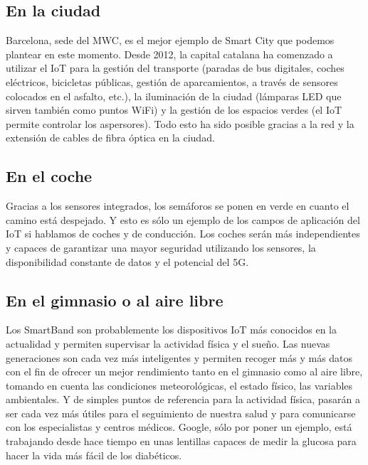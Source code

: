\documentclass[]{article}
\begin{document}
\subsection{En la ciudad}

Barcelona, sede del MWC, es el mejor ejemplo de Smart City que podemos plantear en este momento. Desde 2012, la capital catalana ha comenzado a utilizar el IoT para la gestión del transporte (paradas de bus digitales, coches eléctricos, bicicletas públicas, gestión de aparcamientos, a través de sensores colocados en el asfalto, etc.), la iluminación de la ciudad (lámparas LED que sirven también como puntos WiFi) y la gestión de los espacios verdes (el IoT permite controlar los aspersores). Todo esto ha sido posible gracias a la red y la extensión de cables de fibra óptica en la ciudad.\\

\subsection{En el coche}

Gracias a los sensores integrados, los semáforos se ponen en verde en cuanto el camino está despejado.  Y esto es sólo un ejemplo de los campos de aplicación del IoT si hablamos de coches y de conducción. Los coches serán más independientes y capaces de garantizar una mayor seguridad utilizando los sensores, la disponibilidad constante de datos y el potencial del 5G.\\

\subsection{En el gimnasio o al aire libre}

Los SmartBand son probablemente los dispositivos IoT más conocidos en la actualidad y permiten supervisar la actividad física y el sueño. Las nuevas generaciones son cada vez más inteligentes y permiten recoger más y más datos con el fin de ofrecer un mejor rendimiento tanto en el gimnasio como al aire libre, tomando en cuenta las condiciones meteorológicas, el estado físico, las variables ambientales. Y de simples puntos de referencia para la actividad física, pasarán a ser cada vez más útiles para el seguimiento de nuestra salud y para comunicarse con los especialistas y centros médicos. Google, sólo por poner un ejemplo, está trabajando desde hace tiempo en unas lentillas capaces de medir la glucosa para hacer la vida más fácil de los diabéticos.\\
\end{document}
